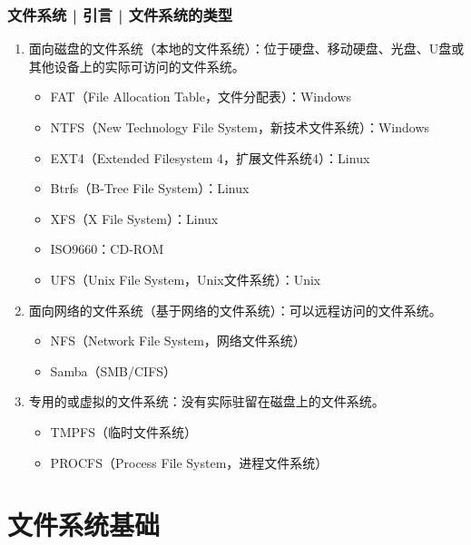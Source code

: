 \begin{frame}
  \frametitle{文件系统 | 引言 | 文件系统的类型}
  \begin{enumerate}
    \item<1-> 面向磁盘的文件系统（本地的文件系统）：位于硬盘、移动硬盘、光盘、U盘或其他设备上的实际可访问的文件系统。
      \begin{itemize}
        \item<4-> FAT（File Allocation Table，文件分配表）：Windows
        \item<4-> NTFS（New Technology File System，新技术文件系统）：Windows
	\item<4-> \alert{EXT4}（Extended Filesystem 4，扩展文件系统4）：Linux
        \item<4-> Btrfs（B-Tree File System）：Linux
        \item<4-> XFS（X File System）：Linux
	\item<4-> \alert{ISO9660}：CD-ROM
        \item<4-> UFS（Unix File System，Unix文件系统）：Unix
      \end{itemize}
    \item<2-> 面向网络的文件系统（基于网络的文件系统）：可以远程访问的文件系统。
      \begin{itemize}
        \item<5-> NFS（Network File System，网络文件系统）
        \item<5-> Samba（SMB/CIFS）
      \end{itemize}
    \item<3-> 专用的或虚拟的文件系统：没有实际驻留在磁盘上的文件系统。
      \begin{itemize}
        \item<6-> TMPFS（临时文件系统）
        \item<6-> PROCFS（Process File System，进程文件系统）
      \end{itemize}
  \end{enumerate}
\end{frame}

\section{文件系统基础}
